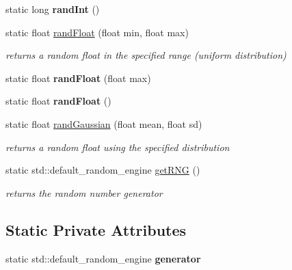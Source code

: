 \begin{DoxyCompactItemize}
\mbox{\label{classnta_1_1Random_aa380bcf4be06bc5b5e4707b7ae5a7907}} 
static long {\bfseries rand\+Int} ()
\item 
\mbox{\label{classnta_1_1Random_a102ed2efec77f974731e5dcdb428174a}} 
static float \hyperlink{classnta_1_1Random_a102ed2efec77f974731e5dcdb428174a}{rand\+Float} (float min, float max)
\begin{DoxyCompactList}\small\item\em returns a random float in the specified range (uniform distribution) \end{DoxyCompactList}\item 
\mbox{\label{classnta_1_1Random_a6820a1c36b820baa68f7bdb2f5f5bf88}} 
static float {\bfseries rand\+Float} (float max)
\item 
\mbox{\label{classnta_1_1Random_aae9df8240d99108188bd6cb223b384a2}} 
static float {\bfseries rand\+Float} ()
\item 
\mbox{\label{classnta_1_1Random_a6e12bc86e5851f01d70debf422746e0e}} 
static float \hyperlink{classnta_1_1Random_a6e12bc86e5851f01d70debf422746e0e}{rand\+Gaussian} (float mean, float sd)
\begin{DoxyCompactList}\small\item\em returns a random float using the specified distribution \end{DoxyCompactList}\item 
\mbox{\label{classnta_1_1Random_a70719bc927413d2df83593c243499c88}} 
static std\+::default\+\_\+random\+\_\+engine \hyperlink{classnta_1_1Random_a70719bc927413d2df83593c243499c88}{get\+R\+NG} ()
\begin{DoxyCompactList}\small\item\em returns the random number generator \end{DoxyCompactList}\end{DoxyCompactItemize}
\subsection*{Static Private Attributes}
\begin{DoxyCompactItemize}
\item 
\mbox{\label{classnta_1_1Random_abbb751e3c32bd8e059696f55b378f4ea}} 
static std\+::default\+\_\+random\+\_\+engine {\bfseries generator}
\end{DoxyCompactItemize}


